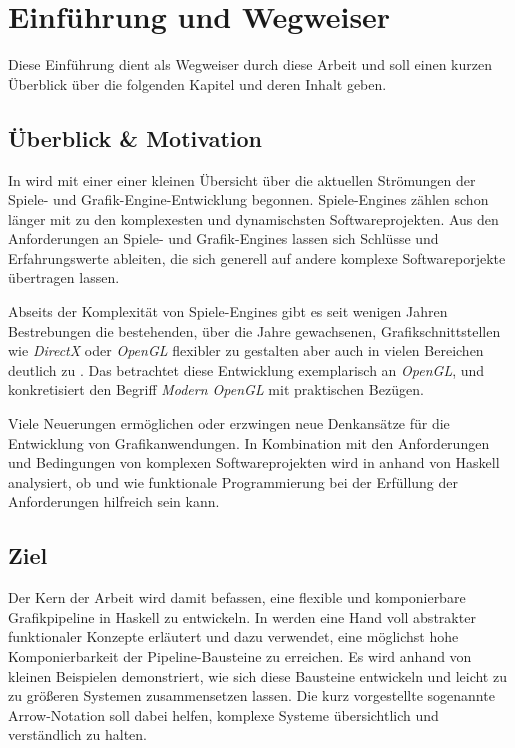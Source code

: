 \chapter{Einführung und Wegweiser}

Diese Einführung dient als Wegweiser durch diese Arbeit und soll einen kurzen Überblick über die folgenden Kapitel und deren Inhalt geben.

\section{Überblick \& Motivation}
In  wird mit einer einer kleinen Übersicht über die aktuellen Strömungen der Spiele- und Grafik-Engine-Entwicklung begonnen. Spiele-Engines zählen schon länger mit zu den komplexesten und dynamischsten Softwareprojekten. Aus den Anforderungen an Spiele- und Grafik-Engines lassen sich Schlüsse und Erfahrungswerte ableiten, die sich generell auf andere komplexe Softwareporjekte übertragen lassen.

Abseits der Komplexität von Spiele-Engines gibt es seit wenigen Jahren Bestrebungen die bestehenden, über die Jahre gewachsenen, Grafikschnittstellen wie \textit{DirectX} oder \textit{OpenGL} flexibler zu gestalten aber auch in vielen Bereichen deutlich zu . Das  betrachtet diese Entwicklung exemplarisch an \textit{OpenGL}, und konkretisiert den Begriff \textit{Modern OpenGL} mit praktischen Bezügen.

Viele Neuerungen ermöglichen oder erzwingen neue Denkansätze für die Entwicklung von Grafikanwendungen. In Kombination mit den Anforderungen und Bedingungen von komplexen Softwareprojekten wird in  anhand von Haskell analysiert, ob und wie funktionale Programmierung bei der Erfüllung der Anforderungen hilfreich sein kann.

\section{Ziel}
Der Kern der Arbeit wird damit befassen, eine flexible und komponierbare Grafikpipeline in Haskell zu entwickeln. In  werden eine Hand voll abstrakter funktionaler Konzepte erläutert und dazu verwendet, eine möglichst hohe Komponierbarkeit der Pipeline-Bausteine zu erreichen. Es wird anhand von kleinen Beispielen demonstriert, wie sich diese Bausteine entwickeln und leicht zu zu größeren Systemen zusammensetzen lassen. Die kurz vorgestellte sogenannte Arrow-Notation soll dabei helfen, komplexe Systeme übersichtlich und verständlich zu halten.

